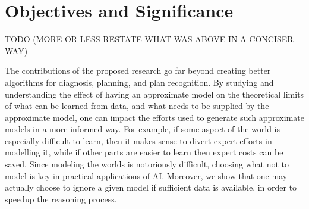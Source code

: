 \documentclass[12pt]{article}
\begin{document}


\section{Objectives and Significance}

TODO (MORE OR LESS RESTATE WHAT WAS ABOVE IN A CONCISER WAY)




The contributions of the proposed research go far beyond creating better algorithms for diagnosis, planning, and plan recognition.  By studying and understanding the effect of having an approximate model on the theoretical limits of what can be learned from data, 
and what needs to be supplied by the approximate model, one can impact the efforts used to generate such approximate models in a more informed way. For example, if some aspect of the world is especially difficult to learn, then it makes sense to divert expert efforts in modelling it, while if other parts are easier to learn then expert costs can be saved. Since modeling the worlds is notoriously difficult, choosing what not to model is key in practical applications of AI. 
Moreover, we show that one may actually choose to ignore a given model 
if sufficient data is available, in order to speedup the reasoning process. 
\end{document}

